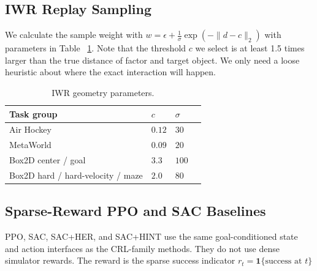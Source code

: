 \subsection{IWR Replay Sampling}

We calculate the sample weight with $w = \epsilon + \frac{1}{\sigma}\exp(-\|d-c\|_2)$ with parameters in Table ~\ref{tab:appendix-iwr-params}. Note that the threshold $c$ we select is at least 1.5 times larger than the true distance of factor and target object. We only need a loose heuristic about where the exact interaction will happen.

\begin{table}[h]
\label{tab:iwr}
\centering
\small
\setlength{\tabcolsep}{5pt}
\caption{IWR geometry parameters.}
\label{tab:appendix-iwr-params}
\begin{tabular}{llll}
\toprule
Task group & $c$ &  $\sigma$ \\
\midrule
Air Hockey & $0.12$ & $30$ \\
MetaWorld & $0.09$ & $20$ \\
Box2D center / goal & $3.3$ & $100$ \\
Box2D hard / hard-velocity / maze & $2.0$ & $80$ \\
\bottomrule
\end{tabular}
\end{table}

\subsection{Sparse-Reward PPO and SAC Baselines}

PPO, SAC, SAC+HER, and SAC+HINT use the same goal-conditioned state and action
interfaces as the CRL-family methods.  They do not use dense simulator rewards.
The reward is the sparse success indicator $r_t=\mathbf{1}\{\text{success at }t\}$

